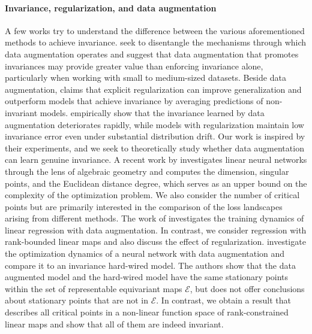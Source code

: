 \documentclass{article}
\theoremstyle{plain}
\theoremstyle{definition}
\theoremstyle{remark}
\theoremstyle{remark}
\begin{document}
\paragraph{Invariance, regularization, and data augmentation}
A few works try to understand the difference between the various aforementioned methods to achieve invariance.
\citet{geiping2023how} seek to disentangle the mechanisms through which data augmentation operates and suggest that data augmentation that promotes invariances may provide greater value than enforcing invariance alone, particularly when working with small to medium-sized datasets. 
Beside data augmentation, \citet{botev2022} claims that explicit regularization can improve generalization and outperform models that achieve invariance by averaging predictions of non-invariant models. 
\citet{moskalev2023ginvariance} empirically show that the invariance learned by data augmentation deteriorates rapidly, while models with regularization maintain low invariance error even under substantial distribution drift. 
Our work is inspired by their experiments, and we seek to theoretically study whether data augmentation can learn genuine invariance.
A recent work by \citet{kohn2024geometry} investigates linear neural networks through the lens of algebraic geometry and computes the dimension, singular points, and the Euclidean distance degree, which serves as an upper bound on the complexity of the optimization problem. 
We also consider the number of critical points but are primarily interested in the comparison of the loss landscapes arising from different methods. The work of \cite{yonatan_2023} investigates the 
training dynamics of linear regression with data augmentation. 
In contrast, we consider regression with rank-bounded linear maps and also discuss the effect of regularization. \citet{nordenfors2024optimization} investigate the optimization dynamics of a neural network with data augmentation and compare it to an invariance hard-wired model. 
The authors show that the data augmented model and the hard-wired model have the same stationary points within the set of representable equivariant maps $\mathcal{E}$, but does not offer conclusions about stationary points 
that are not in $\mathcal{E}$. 
In contrast, we obtain a result that describes all critical points in a non-linear function space of rank-constrained linear maps and show that all of them are indeed invariant.
\end{document}

